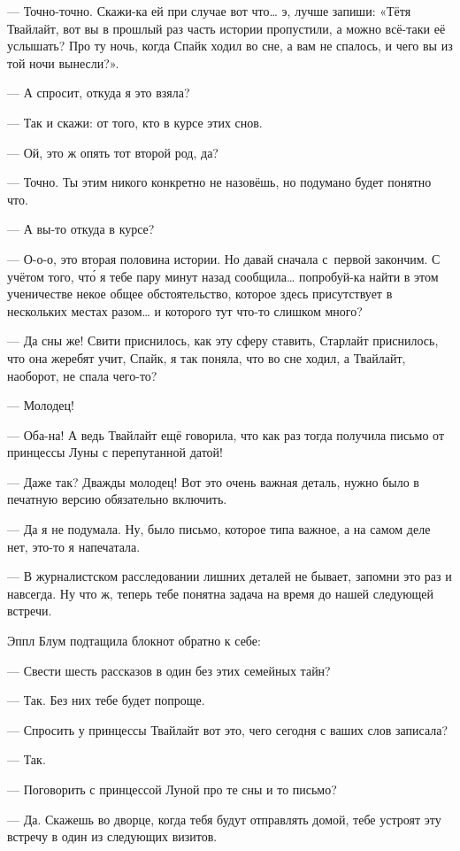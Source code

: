 \documentclass[fontsize=11pt,a5paper,titlepage=firstcover]{scrbook}
\begin{document}
--- Точно-точно. Скажи-ка ей при случае вот что{\ldots} э, лучше запиши: «Тётя Твайлайт, вот вы в прошлый раз часть истории пропустили, а можно всё-таки её услышать? Про ту ночь, когда Спайк ходил во сне, а вам не спалось, и чего вы из той ночи вынесли?».

--- А спросит, откуда я это взяла?

--- Так и скажи: от того, кто в курсе этих снов.

--- Ой, это ж опять тот второй род, да?

--- Точно. Ты этим никого конкретно не назовёшь, но подумано будет понятно что.

--- А вы-то откуда в курсе?

--- О-о-о, это вторая половина истории. Но давай сначала с~первой закончим. С учётом того, что́ я тебе пару минут назад сообщила{\ldots} попробуй-ка найти в этом ученичестве некое общее обстоятельство, которое здесь присутствует в нескольких местах разом{\ldots} и которого тут что-то слишком много?

--- Да сны же! Свити приснилось, как эту сферу ставить, Старлайт приснилось, что она жеребят учит, Спайк, я так поняла, что во сне ходил, а Твайлайт, наоборот, не спала чего-то?

--- Молодец!

--- Оба-на! А ведь Твайлайт ещё говорила, что как раз тогда получила письмо от принцессы Луны с перепутанной датой!

--- Даже так? Дважды молодец! Вот это очень важная деталь, нужно было в печатную версию обязательно включить.

--- Да я не подумала. Ну, было письмо, которое типа важное, а на самом деле нет, это-то я напечатала.

--- В журналистском расследовании лишних деталей не бывает, запомни это раз и навсегда. Ну что ж, теперь тебе понятна задача на время до нашей следующей встречи.

Эппл Блум подтащила блокнот обратно к себе:

--- Свести шесть рассказов в один без этих семейных тайн?

--- Так. Без них тебе будет попроще.

--- Спросить у принцессы Твайлайт вот это, чего сегодня с ваших слов записала?

--- Так.

--- Поговорить с принцессой Луной про те сны и то письмо?

--- Да. Скажешь во дворце, когда тебя будут отправлять домой, тебе устроят эту встречу в один из следующих визитов.
\end{document}
